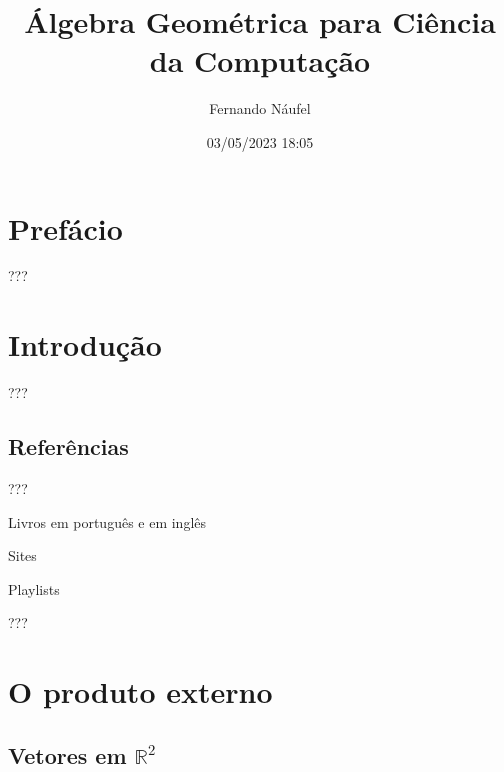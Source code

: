 \documentclass[
  letterpaper,
  DIV=11,
  numbers=noendperiod]{scrreprt}
\title{Álgebra Geométrica para Ciência da Computação}
\author{Fernando Náufel}
\date{03/05/2023 18:05}
\renewcommand*\contentsname{Índice}
\newcommand\contentsname{Índice}
\begin{document}
\maketitle


\ifdefined\Shaded\renewenvironment{Shaded}{\begin{tcolorbox}[sharp corners, interior hidden, enhanced, borderline west={3pt}{0pt}{shadecolor}, breakable, boxrule=0pt, frame hidden]}{\end{tcolorbox}}\fi

\renewcommand*\contentsname{Índice}
{
\hypersetup{linkcolor=}
\setcounter{tocdepth}{2}
\tableofcontents
}
\providecommand{\reais}{\mathbb{R}}
\providecommand{\vetor}[1]{\mathbf{#1}}
\providecommand{\ve}[1]{\vetor{e}_{#1}}

\hypertarget{prefuxe1cio}{%
\chapter*{Prefácio}\label{prefuxe1cio}}

???

\hypertarget{sec-intro}{%
\chapter{Introdução}\label{sec-intro}}

???

\hypertarget{referuxeancias}{%
\section{Referências}\label{referuxeancias}}

???

Livros em português e em inglês

Sites

Playlists

???

\providecommand{\reais}{\mathbb{R}}
\providecommand{\vetor}[1]{\mathbf{#1}}
\providecommand{\ve}[1]{\vetor{e}_{#1}}

\hypertarget{sec-prod-ext}{%
\chapter{O produto externo}\label{sec-prod-ext}}

\hypertarget{sec-vetores-r2}{%
\section{\texorpdfstring{Vetores em
$\mathbb{R}^2$}{Vetores em }}\label{sec-vetores-r2}}
\end{document}
